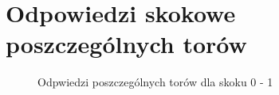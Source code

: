 \chapter{Odpowiedzi skokowe poszczególnych torów}

\begin{figure}[H]
    \centering
    
    \caption{Odpwiedzi poszczególnych torów dla skoku 0 - 1}
\end{figure}
    
